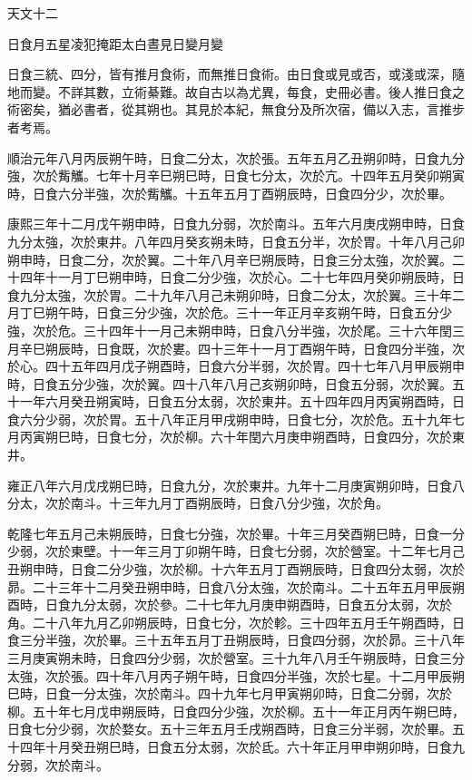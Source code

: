 
\begin{pinyinscope}
天文十二

日食月五星凌犯掩距太白晝見日變月變

日食三統、四分，皆有推月食術，而無推日食術。由日食或見或否，或淺或深，隨地而變。不詳其數，立術綦難。故自古以為尤異，每食，史冊必書。後人推日食之術密矣，猶必書者，從其朔也。其見於本紀，無食分及所次宿，備以入志，言推步者考焉。

順治元年八月丙辰朔午時，日食二分太，次於張。五年五月乙丑朔卯時，日食九分強，次於觜觿。七年十月辛巳朔巳時，日食七分太，次於亢。十四年五月癸卯朔寅時，日食六分半強，次於觜觿。十五年五月丁酉朔辰時，日食四分少，次於畢。

康熙三年十二月戊午朔申時，日食九分弱，次於南斗。五年六月庚戌朔申時，日食九分太強，次於東井。八年四月癸亥朔未時，日食五分半，次於胃。十年八月己卯朔申時，日食二分，次於翼。二十年八月辛巳朔辰時，日食三分太強，次於翼。二十四年十一月丁巳朔申時，日食二分少強，次於心。二十七年四月癸卯朔辰時，日食九分太強，次於胃。二十九年八月己未朔卯時，日食二分太，次於翼。三十年二月丁巳朔午時，日食三分少強，次於危。三十一年正月辛亥朔午時，日食五分少強，次於危。三十四年十一月己未朔申時，日食八分半強，次於尾。三十六年閏三月辛巳朔辰時，日食既，次於婁。四十三年十一月丁酉朔午時，日食四分半強，次於心。四十五年四月戊子朔酉時，日食六分半弱，次於胃。四十七年八月甲辰朔申時，日食五分少強，次於翼。四十八年八月己亥朔卯時，日食五分弱，次於翼。五十一年六月癸丑朔寅時，日食五分太弱，次於東井。五十四年四月丙寅朔酉時，日食六分少弱，次於胃。五十八年正月甲戌朔申時，日食七分，次於危。五十九年七月丙寅朔巳時，日食七分，次於柳。六十年閏六月庚申朔酉時，日食四分，次於東井。

雍正八年六月戊戌朔巳時，日食九分，次於東井。九年十二月庚寅朔卯時，日食八分太，次於南斗。十三年九月丁酉朔辰時，日食八分少強，次於角。

乾隆七年五月己未朔辰時，日食七分強，次於畢。十年三月癸酉朔巳時，日食一分少弱，次於東壁。十一年三月丁卯朔午時，日食七分弱，次於營室。十二年七月己丑朔申時，日食二分少強，次於柳。十六年五月丁酉朔辰時，日食四分太弱，次於昴。二十三年十二月癸丑朔申時，日食八分太強，次於南斗。二十五年五月甲辰朔酉時，日食九分太弱，次於參。二十七年九月庚申朔酉時，日食五分太弱，次於角。二十八年九月乙卯朔辰時，日食七分，次於軫。三十四年五月壬午朔酉時，日食三分半強，次於畢。三十五年五月丁丑朔辰時，日食四分弱，次於昴。三十八年三月庚寅朔未時，日食四分少弱，次於營室。三十九年八月壬午朔辰時，日食三分太強，次於張。四十年八月丙子朔午時，日食四分半強，次於七星。十二月甲辰朔巳時，日食一分太強，次於南斗。四十九年七月甲寅朔卯時，日食二分弱，次於柳。五十年七月戊申朔辰時，日食四分少強，次於柳。五十一年正月丙午朔巳時，日食七分少弱，次於婺女。五十三年五月壬戌朔酉時，日食三分半弱，次於畢。五十四年十月癸丑朔巳時，日食五分太弱，次於氐。六十年正月甲申朔卯時，日食九分弱，次於南斗。


\end{pinyinscope}
